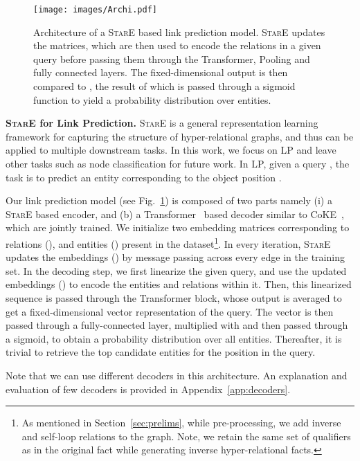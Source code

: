\documentclass[11pt,a4paper]{article}
\begin{document}
\begin{figure}[t]
    \centering
    \texttt{[image: images/Archi.pdf]}
  \caption{Architecture of a \textsc{StarE} based link prediction model. \textsc{StarE} updates the  matrices, which are then used to encode the relations in a given query before passing them through the Transformer, Pooling and fully connected layers. The fixed-dimensional output is then compared to , the result of which is passed through a sigmoid function to yield a probability distribution over entities. }
  \label{fig:archi}
\end{figure}


\textbf{\textsc{StarE} for Link Prediction.}
\textsc{StarE} is a general representation learning framework for capturing the structure of hyper-relational graphs, and thus can be applied to multiple downstream tasks. In this work, we focus on LP and leave other tasks such as node classification for future work. 
In LP, given a query , the task is to predict an entity corresponding to the object position .

Our link prediction model (see Fig.~\ref{fig:archi}) is composed of two parts namely (i) a \textsc{StarE} based encoder, and (b) a Transformer~\citep{DBLP:conf/nips/VaswaniSPUJGKP17} based decoder similar to CoKE~\citep{DBLP:journals/corr/abs-1911-02168}, which are jointly trained. 
We initialize two embedding matrices  corresponding to relations (), and entities () present in the dataset\footnote{As mentioned in Section~\ref{sec:prelims}, while pre-processing, we add inverse and self-loop relations to the graph. 
Note, we retain the same set of qualifiers as in the original fact while generating inverse hyper-relational facts.}. 
In every iteration, \textsc{StarE} updates the embeddings ()  by message passing across every edge in the training set. 
In the decoding step, we first linearize the given query, and use the updated embeddings () to encode the entities and relations within it. 
Then, this linearized sequence is passed through the Transformer block, whose output is averaged to get a fixed-dimensional vector representation of the query.
The vector is then passed through a fully-connected layer,  multiplied with  and then passed through a sigmoid, to obtain a probability distribution over all entities. Thereafter, it is trivial to retrieve the top  candidate entities for the  position in the query.


Note that we can use different decoders in this architecture. An explanation and evaluation of few decoders is provided in Appendix~\ref{app:decoders}.
\end{document}
